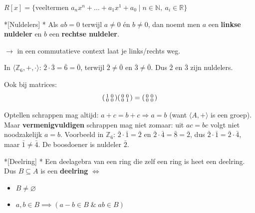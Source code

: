 $R[x] = \{\text{veeltermen } a_nx^n + \dots + a_1x^1 + a_0 \mid n \in \mathbb{N},\ a_i \in \mathbb{R}\}$

\begin{nicedefinition}*[Nuldelers]
    \nextpart[]*
    Als $ab=0$ terwijl $a\neq0$ én $b\neq0$, dan noemt men $a$ een \textcolor{PineGreen!75!black}{\textbf{linkse nuldeler}} en $b$ een \textcolor{PineGreen!75!black}{\textbf{rechtse nuldeler}}.

    $\to$ in een commutatieve context laat je links/rechts weg.
\end{nicedefinition}

\textbf{} In $\langle \mathbb{Z}_6,+,\cdot \rangle$: $\bar{2}\cdot \bar{3} = \bar{6} = \bar{0}$, terwijl $\bar{2} \neq \bar{0}$ en $\bar{3} \neq \bar{0}$. Dus $\bar{2}$ en $\bar{3}$ zijn nuldelers.

Ook bij matrices:
\begin{equation*}
    \begin{psmallmatrix}1&0\\0&0\end{psmallmatrix}\begin{psmallmatrix}0&0\\0&1\end{psmallmatrix} = \begin{psmallmatrix}0&0\\0&0\end{psmallmatrix}
\end{equation*}

\begin{barbox}[PineGreen][gray!3]
    Optellen schrappen mag altijd: $a+c = b+c \Rightarrow a=b$ (want $\langle A,+ \rangle$ is een groep). Maar \textbf{vermenigvuldigen} schrappen mag niet zomaar: uit $ac = bc$ volgt niet noodzakelijk $a=b$. Voorbeeld in $\mathbb{Z}_6$: $\bar{2} \cdot \bar{1} = \bar{2}$ en $\bar{2} \cdot \bar{4} = \bar{8} = \bar{2}$, dus $\bar{2} \cdot \bar{1} = \bar{2} \cdot \bar{4}$, maar $\bar{1} \neq \bar{4}$. De boosdoener is nuldeler $\bar{2}$.
\end{barbox}

\begin{nicedefinition}*[Deelring]
    \nextpart[]*
    Een deelagebra van een ring die zelf een ring is heet een deelring.
    Dus $B \subseteq A$ is een \textcolor{PineGreen!75!black}{\textbf{deelring}} $\iff$
    \begin{itemize}
        \item[] $B \neq \varnothing$
        \item[] $a,b \in B \implies (a-b \in B \;\&\; ab \in B)$
    \end{itemize}
\end{nicedefinition}

